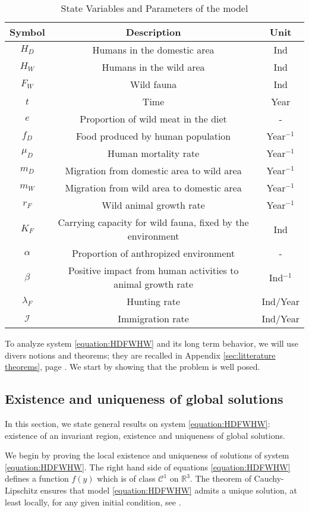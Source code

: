 \documentclass{article}
\newcommand{\lfw}{\lambda_{F}}
\newcommand{\lfw}{\lambda_{F}}
\theoremstyle{definition}
\theoremstyle{remark}
\begin{document}
\begin{table}[ht]
\center
\begin{tabular}{|c|c|c|}
\hline 
Symbol & Description & Unit \\ 
\hline \hline
$H_D$ & Humans in the domestic area & Ind \\
$H_W$ & Humans in the wild area & Ind \\
$F_W$ & Wild fauna & Ind \\
\hline \hline
$t$ & Time & Year \\
$e$ & Proportion of wild meat in the diet & - \\
$f_D$ & Food produced by human population & Year$^{-1}$ \\
$\mu_D$ & Human mortality rate  & Year$^{-1}$ \\
$m_D$ & Migration from domestic area to wild area & Year$^{-1}$ \\
$m_W$ & Migration from wild area to domestic area & Year$^{-1}$ \\
$r_F$ & Wild animal growth rate & Year$^{-1}$ \\
$K_F$ & Carrying capacity for wild fauna, fixed by the environment& Ind \\
$\alpha$ & Proportion of anthropized environment & - \\
$\beta$ & Positive impact from human activities to animal growth rate & Ind$^{-1}$  \\
$\lfw$ & Hunting rate & Ind/Year\\
$\mathcal{I}$ & Immigration rate &Ind/Year\\
\hline
\end{tabular}
\caption{State Variables and Parameters of the model}
\label{table:symbol}
\end{table}

To analyze system \eqref{equation:HDFWHW} and its long term behavior, we will use divers notions and theorems; they are recalled in Appendix \ref{sec:litterature theorems}, page \pageref{sec:litterature theorems}. We start by showing that the problem is well posed.

\subsection{Existence and uniqueness of global solutions}
In this section, we state general results on system \eqref{equation:HDFWHW}:  existence of an invariant region, existence and uniqueness of global solutions.

We begin by proving the local existence and uniqueness of solutions of system \eqref{equation:HDFWHW}. The right hand side of equations \eqref{equation:HDFWHW} defines a function $f(y)$ which is of class $\mathcal{C}^1$ on $\mathbb{R}^3$. The theorem of Cauchy-Lipschitz ensures that model \eqref{equation:HDFWHW} admits a unique solution, at least locally, for any given initial condition, see \cite{walter_ordinary_1998}.
\end{document}
